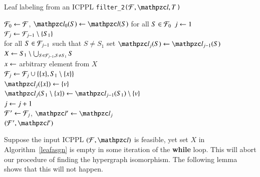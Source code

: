 \documentclass[MS,]{iitmdiss}
\begin{document}
\begin{algorithm}[h]
  \caption{Leaf labeling from an ICPPL {\tt filter\_2($\cF, \cl, T$)}}
  \label{leafasgn}
  \begin{algorithmic}[\lndisplay]
    \STATE ${\cal F}_0 \leftarrow {\cal F}$, $\cl_0(S) \assign \cl(S)$ for all $S \in {\cal F}_0$
    \STATE $j \leftarrow 1$\\
    \label{uniqueleaf}
    \STATE ${\cal F}_j \leftarrow {\cal F}_{j-1} \setminus \{S_1\}$\\
    \STATE for all $S \in {\cal F}_{j-1}$ such that $S \ne S_1$ set
    $\cl_j(S) \assign
    \cl_{j-1}(S)$\\
    \STATE $X \leftarrow S_1 \setminus \bigcup_{S \in {\cal F}_{j-1}, S \ne S_1}S$\\
     \label{xempty}  \label{ln:exit2} \ENDIF
    \STATE $x \leftarrow $ arbitrary element from $X$\\
    \STATE ${\cal F}_j \leftarrow {\cal F}_j \cup \{\{x\}, S_1 \setminus \{x\}\} $\\
    \STATE $\cl_j(\{x\}) \assign \{v\}$\\
    \STATE $\cl_j(S_1 \setminus \{x\}) \assign \cl_{j-1}(S_1) \setminus \{v\}$\\
    \STATE $j \leftarrow j+1$\\
    \ENDWHILE
    \STATE ${\cal F}' \leftarrow {\cal F}_j$, $\cl' \assign \cl_j$\\
    \RETURN $(\cF', \cl')$
  \end{algorithmic}
\end{algorithm}

Suppose the input ICPPL $(\cF, \cl)$ is feasible, yet set $X$ in
Algorithm~\ref{leafasgn} is empty in some iteration of the {\bf while}
loop. This will abort our procedure of finding the hypergraph
isomorphism. The following lemma shows that this will not happen.
\end{document}

